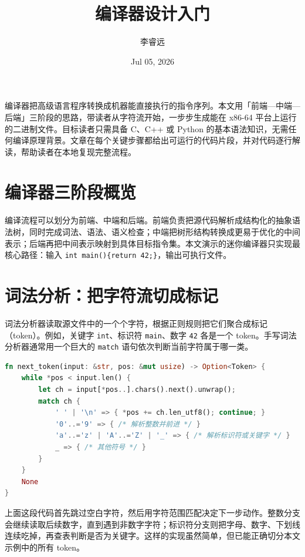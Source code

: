 \title{编译器设计入门}
\author{李睿远}
\date{Jul 05, 2026}
\maketitle
编译器把高级语言程序转换成机器能直接执行的指令序列。本文用「前端—中端—后端」三阶段的思路，带读者从字符流开始，一步步生成能在 x86-64 平台上运行的二进制文件。目标读者只需具备 C、C++ 或 Python 的基本语法知识，无需任何编译原理背景。文章在每个关键步骤都给出可运行的代码片段，并对代码逐行解读，帮助读者在本地复现完整流程。\par
\chapter{编译器三阶段概览}
编译流程可以划分为前端、中端和后端。前端负责把源代码解析成结构化的抽象语法树，同时完成词法、语法、语义检查；中端把树形结构转换成更易于优化的中间表示；后端再把中间表示映射到具体目标指令集。本文演示的迷你编译器只实现最核心路径：输入 \texttt{int main()\{{}return 42;\}{}}，输出可执行文件。\par
\chapter{词法分析：把字符流切成标记}
词法分析器读取源文件中的一个个字符，根据正则规则把它们聚合成标记（token）。例如，关键字 \texttt{int}、标识符 \texttt{main}、数字 \texttt{42} 各是一个 token。手写词法分析器通常用一个巨大的 \texttt{match} 语句依次判断当前字符属于哪一类。\par
\begin{lstlisting}[language=rust]
fn next_token(input: &str, pos: &mut usize) -> Option<Token> {
    while *pos < input.len() {
        let ch = input[*pos..].chars().next().unwrap();
        match ch {
            ' ' | '\n' => { *pos += ch.len_utf8(); continue; }
            '0'..='9' => { /* 解析整数并前进 */ }
            'a'..='z' | 'A'..='Z' | '_' => { /* 解析标识符或关键字 */ }
            _ => { /* 其他符号 */ }
        }
    }
    None
}
\end{lstlisting}
上面这段代码首先跳过空白字符，然后用字符范围匹配决定下一步动作。整数分支会继续读取后续数字，直到遇到非数字字符；标识符分支则把字母、数字、下划线连续吃掉，再查表判断是否为关键字。这样的实现虽然简单，但已能正确切分本文示例中的所有 token。\par

